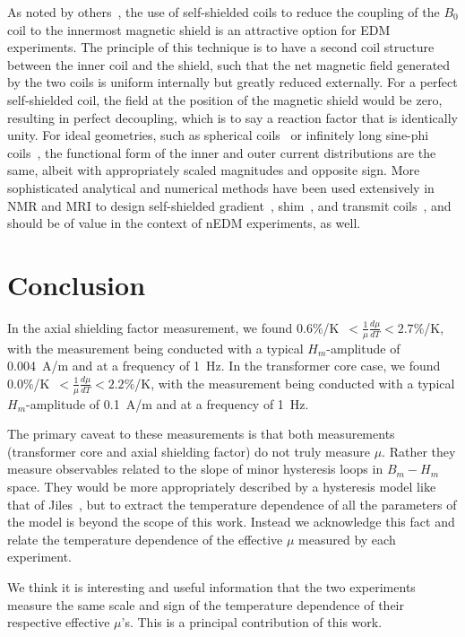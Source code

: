 As noted by others~\cite{khriplovich1997cp}, the use of
self-shielded coils to reduce the coupling of the $B_0$ coil to the
innermost magnetic shield is an attractive option for EDM experiments.
The principle of this technique is to have a second coil structure
between the inner coil and the shield, such that the net magnetic
field generated by the two coils is uniform internally but greatly
reduced externally.  For a perfect self-shielded coil, the field at
the position of the magnetic shield would be zero, resulting in
perfect decoupling, which is to say a reaction factor that is
identically unity.  For ideal geometries, such as spherical
coils~\cite{brown1945fluxball, wheeler1958spherical,purcell1989} or infinitely long
sine-phi coils~\cite{bethBNL,bethUSpatent,bidinosti2005}, the
functional form of the inner and outer current distributions are the
same, albeit with appropriately scaled magnitudes and opposite sign.
More sophisticated analytical and numerical methods have been used
extensively in NMR and MRI to design self-shielded
gradient~\cite{turner1986,hidalgo},
shim~\cite{brideson,forbes}, and transmit
coils~\cite{bidinosti2005,kuzmin}, and should be of value in the
context of nEDM experiments, as well.


\section{Conclusion}

In the axial shielding factor measurement, we found
0.6\%/K~$<\frac{1}{\mu}\frac{d\mu}{dT}<2.7\%$/K, with the measurement
being conducted with a typical $H_m$-amplitude of 0.004~A/m and at a
frequency of 1~Hz.  In the transformer core case, we found
0.0\%/K~$<\frac{1}{\mu}\frac{d\mu}{dT}<2.2\%$/K, with the measurement
being conducted with a typical $H_m$-amplitude of 0.1~A/m and at a
frequency of 1~Hz.

The primary caveat to these measurements is that both measurements
(transformer core and axial shielding factor) do not truly measure
$\mu$.  Rather they measure observables related to the slope of minor
hysteresis loops in $B_m-H_m$ space.  They would be more appropriately
described by a hysteresis model like that of
Jiles~\cite{jiles1994frequency}, but to extract the temperature
dependence of all the parameters of the model is beyond the scope of
this work.  Instead we acknowledge this fact and relate the
temperature dependence of the effective $\mu$ measured by each
experiment.

We think it is interesting and useful information that the two
experiments measure the same scale and sign of the temperature
dependence of their respective effective $\mu$'s.  This is a principal
contribution of this work.

